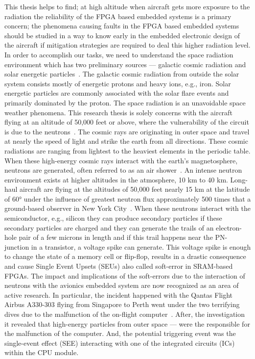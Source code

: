 This thesis helps to find; at high altitude when aircraft gets more exposure to the radiation the reliability of the FPGA based embedded systems is a primary concern; the phenomena causing faults in the FPGA based embedded systems should be studied in a way to know early in the embedded electronic design of the aircraft if mitigation strategies are required to deal this higher radiation level. 
In order to accomplish our tasks, we need to understand the space radiation environment which has two preliminary sources --- galactic cosmic radiation and solar energetic particles~\citep{SWE20216}. The galactic cosmic radiation from outside the solar system consists mostly of energetic protons and heavy ions, e.g., iron. Solar energetic particles are commonly associated with the solar flare events and primarily dominated by the proton.  The space radiation is an unavoidable space weather phenomena. This research thesis is solely concerns with the aircraft flying at an altitude of 50,000 feet or above, where the vulnerability of the circuit is due to the neutrons~\citep{xilinnseu}. The cosmic rays are originating in outer space and travel at nearly the speed of light and strike the earth from all directions. These cosmic radiations are ranging from lightest to the heaviest elements in the periodic table. When these high-energy cosmic rays interact with the earth's magnetosphere, neutrons are generated, often referred to as an air shower~\citep{lesea2005rosetta}.  An intense neutron environment exists at higher altitudes in the atmosphere, 10 km to 40 km.  Long-haul aircraft are flying at the altitudes of 50,000 feet nearly 15 km at the latitude of \ang{60} under the influence of greatest neutron flux approximately 500 times that a ground-based observer in New York City~\citep{lesea2005rosetta}. When these neutrons interact with the semiconductor, e.g., silicon they can produce secondary particles if these secondary particles are charged and they can generate the trails of an electron-hole pair of a few microns in length and if this trail happens near the PN-junction in a transistor, a voltage spike can generate. This voltage spike is enough to change the state of a memory cell or flip-flop, results in a drastic consequence and cause Single Event Upsets (SEUs) also called soft-error in SRAM-based FPGAs. The impact and implications of the soft-errors due to the interaction of neutrons with the avionics embedded system are now recognized as an area of active research. In particular, the incident happened with the Qantas Flight Airbus A330-303 flying from Singapore to Perth went under the two terrifying dives due to the malfunction of the on-flight computer~\citep{SWE20216}. After, the investigation it revealed that high-energy particles from outer space --- were the responsible for the malfunction of the computer. And, the potential triggering event was the single-event effect (SEE) interacting with one of the integrated circuits (ICs) within the CPU module. 


